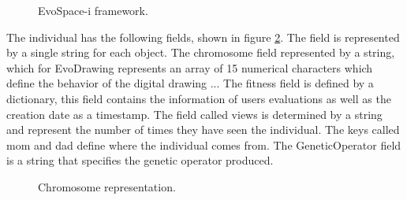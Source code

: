 \begin{figure}
\captionsetup{justification=centering,margin=2cm}
\centering
\setlength\fboxsep{0pt}
\setlength\fboxrule{0.7pt}
\caption{EvoSpace-i framework.}
\label{fig:ESFramework}       
\end{figure}


The individual has the following fields, shown in figure \ref{fig:individual_dic}.
The field is represented by a single string for each object. The chromosome
field represented by a string, which for EvoDrawing represents an array of 15
numerical characters which define the behavior of the digital drawing ... The
fitness field is defined by a dictionary, this field contains the information of
users evaluations as well as the creation date as a timestamp. The field called
views is determined by a string and represent the number of times they have seen
the individual. The keys called mom and dad define where the individual comes
from. The GeneticOperator field is a string that specifies the genetic operator
produced.

\begin{figure}
\captionsetup{justification=centering,margin=2cm}
\centering
\setlength\fboxsep{0pt}
\setlength\fboxrule{0.7pt}
\caption{Chromosome representation.}
\label{fig:individual_dic}       
\end{figure}

